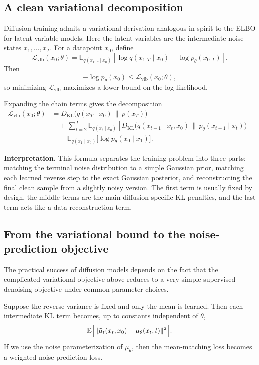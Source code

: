 \subsection*{A clean variational decomposition}

Diffusion training admits a variational derivation analogous in spirit to the ELBO for latent-variable models.
Here the latent variables are the intermediate noise states $x_1,\dots,x_T$.
For a datapoint $x_0$, define
\[
\mathcal{L}_{\mathrm{vlb}}(x_0;\theta)
=
\mathbb{E}_{q(x_{1:T}\mid x_0)}
\left[
\log q(x_{1:T}\mid x_0) - \log p_\theta(x_{0:T})
\right].
\]
Then
\[
-\log p_\theta(x_0)
\le
\mathcal{L}_{\mathrm{vlb}}(x_0;\theta),
\]
so minimizing $\mathcal{L}_{\mathrm{vlb}}$ maximizes a lower bound on the log-likelihood.

Expanding the chain terms gives the decomposition
\begin{align*}
\mathcal{L}_{\mathrm{vlb}}(x_0;\theta)
&=
D_{\mathrm{KL}}\!\bigl(q(x_T\mid x_0)\,\|\,p(x_T)\bigr)
\\
&\quad + \sum_{t=2}^{T}
\mathbb{E}_{q(x_t\mid x_0)}
\left[
D_{\mathrm{KL}}\!\bigl(q(x_{t-1}\mid x_t,x_0)\,\|\,p_\theta(x_{t-1}\mid x_t)\bigr)
\right]
\\
&\quad - \mathbb{E}_{q(x_1\mid x_0)}\bigl[\log p_\theta(x_0\mid x_1)\bigr].
\end{align*}

\noindent
\textbf{Interpretation.}
This formula separates the training problem into three parts:
matching the terminal noise distribution to a simple Gaussian prior, matching each learned reverse step to the exact Gaussian posterior, and reconstructing the final clean sample from a slightly noisy version.
The first term is usually fixed by design, the middle terms are the main diffusion-specific KL penalties, and the last term acts like a data-reconstruction term.

\subsection*{From the variational bound to the noise-prediction objective}

The practical success of diffusion models depends on the fact that the complicated variational objective above reduces to a very simple supervised denoising objective under common parameter choices.

Suppose the reverse variance is fixed and only the mean is learned.
Then each intermediate KL term becomes, up to constants independent of $\theta$,
\[
\mathbb{E}\Bigl[\|\tilde\mu_t(x_t,x_0)-\mu_\theta(x_t,t)\|^2\Bigr].
\]
If we use the noise parameterization of $\mu_\theta$, then the mean-matching loss becomes a weighted noise-prediction loss.

